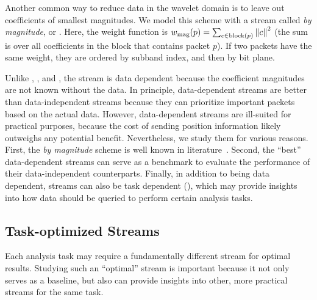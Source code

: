 Another common way to reduce data in the wavelet domain is to leave out coefficients of smallest
magnitudes.
 We model this scheme with a stream called \emph{by magnitude}, or \smag. Here, the
weight function is $\wmag(p)=\sum_{c\in \text{block}(p)}\norm{c}^2$ (the sum is over all
coefficients in the block that contains packet $p$). If two packets have the same weight, they are
ordered by subband index, and then by bit plane. 

Unlike \slvl, \sbit, and \swav, the \smag stream is
data dependent because the coefficient magnitudes are not known without the data.
%
In principle, data-dependent streams are better than data-independent streams because they can
prioritize important packets based on the actual data. However, data-dependent streams are
ill-suited for practical purposes, because the cost of sending position information likely outweighs
any potential benefit. Nevertheless, we study them for various reasons. First, the \emph{by
magnitude} scheme is well known in literature~\cite{vapor2007}. Second, the ``best'' data-dependent streams 
can
serve as a benchmark to evaluate the performance of their data-independent counterparts. Finally, in
addition to being data dependent, streams can also be task dependent (),
which may provide insights into how data should be queried to perform certain analysis tasks.

\subsection{Task-optimized Streams} \label{sec:data_dep_streams}

Each analysis task may require a fundamentally different stream for optimal results. Studying such
an ``optimal'' stream is important because it not only serves as a baseline,
but also can provide insights into other, more practical streams for the same task.

